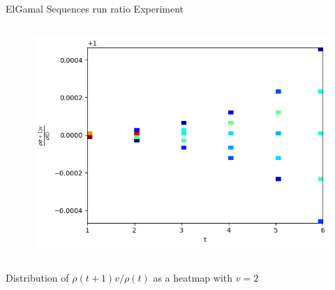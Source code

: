 \begin{frame}{ElGamal Sequences run ratio Experiment}
\begin{columns}
\begin{column}{0.45\textwidth}
\begin{figure}
                \includegraphics[width=\textwidth]{figures/v2AndvisGenNormalizedrunratio.png}
            \end{figure}
        \end{column}
    \end{columns}
    \begin{center}
                Distribution of $\rho(t+1)v/\rho(t)$ as a heatmap with $v = 2$
    \end{center}
\end{frame}

